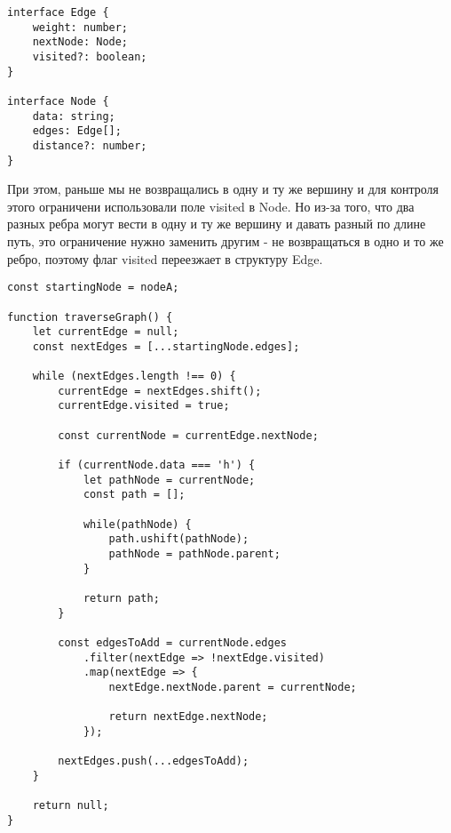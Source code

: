 \documentclass[../article.tex]{subfiles}
\begin{document}
\begin{ruledelement}
    \begin{lstlisting}[caption={Структура для взвешенного графа}, label={lst:weighetGrahStruct}]
interface Edge {
    weight: number;
    nextNode: Node;
    visited?: boolean;
}

interface Node {
    data: string;
    edges: Edge[];
    distance?: number;
}
    \end{lstlisting}
\end{ruledelement}

При этом, раньше мы не возвращались в одну и ту же вершину и для контроля этого ограничени использовали поле {\firacodebold visited} в {\firacodebold Node}. Но из-за того, что два разных ребра могут вести в одну и ту же вершину и давать разный по длине путь, это ограничение нужно заменить другим - не возвращаться в одно и то же ребро, поэтому флаг {\firacodebold visited} переезжает в структуру {\firacodebold Edge}.

\begin{figure*}[h]
    \begin{ruledelement}
        \begin{lstlisting}[caption={Поиск пути при обходе взвешенного графа в ширину}, label={lst:bfsWeightedRandomPath}]
const startingNode = nodeA;

function traverseGraph() {
    let currentEdge = null;
    const nextEdges = [...startingNode.edges];

    while (nextEdges.length !== 0) {
        currentEdge = nextEdges.shift();
        currentEdge.visited = true;

        const currentNode = currentEdge.nextNode;

        if (currentNode.data === 'h') {
            let pathNode = currentNode;
            const path = [];

            while(pathNode) {
                path.ushift(pathNode);
                pathNode = pathNode.parent;
            }

            return path;
        }

        const edgesToAdd = currentNode.edges
            .filter(nextEdge => !nextEdge.visited)
            .map(nextEdge => {
                nextEdge.nextNode.parent = currentNode;

                return nextEdge.nextNode;
            });

        nextEdges.push(...edgesToAdd);
    }

    return null;
}
        \end{lstlisting}
    \end{ruledelement}

\end{figure*}
\end{document}
